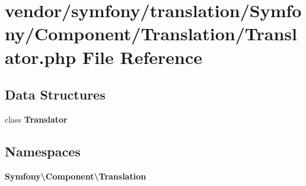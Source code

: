 \section{vendor/symfony/translation/\+Symfony/\+Component/\+Translation/\+Translator.php File Reference}
\label{symfony_2translation_2_symfony_2_component_2_translation_2_translator_8php}
\subsection*{Data Structures}
\begin{DoxyCompactItemize}
\item 
class {\bf Translator}
\end{DoxyCompactItemize}
\subsection*{Namespaces}
\begin{DoxyCompactItemize}
\item 
 {\bf Symfony\textbackslash{}\+Component\textbackslash{}\+Translation}
\end{DoxyCompactItemize}
